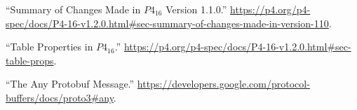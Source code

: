 \documentclass[11pt]{article}
\begin{document}
{{\begin{thebibliography}{38}
\mdbibitemlabel{{}[28]}\textquotedblleft{}Summary of Changes Made in $P4_{16}$ Version 1.1.0.\textquotedblright{} \href{https://p4.org/p4-spec/docs/P4-16-v1.2.0.html\%23sec-summary-of-changes-made-in-version-110}{{\ttfamily https://\hspace{0pt}p4.\hspace{0pt}org/\hspace{0pt}p4-\hspace{0pt}spec/\hspace{0pt}docs/\hspace{0pt}P4-\hspace{0pt}16-\hspace{0pt}v1.\hspace{0pt}2.\hspace{0pt}0.\hspace{0pt}html\#\hspace{0pt}sec-\hspace{0pt}summary-\hspace{0pt}of-\hspace{0pt}changes-\hspace{0pt}made-\hspace{0pt}in-\hspace{0pt}version-\hspace{0pt}110}}.\label{p4revisions110}%

\mdbibitemlabel{{}[29]}\textquotedblleft{}Table Properties in $P4_{16}$.\textquotedblright{} \href{https://p4.org/p4-spec/docs/P4-16-v1.2.0.html\%23sec-table-props}{{\ttfamily https://\hspace{0pt}p4.\hspace{0pt}org/\hspace{0pt}p4-\hspace{0pt}spec/\hspace{0pt}docs/\hspace{0pt}P4-\hspace{0pt}16-\hspace{0pt}v1.\hspace{0pt}2.\hspace{0pt}0.\hspace{0pt}html\#\hspace{0pt}sec-\hspace{0pt}table-\hspace{0pt}props}}.\label{p4tableproperties}%

\mdbibitemlabel{{}[30]}\textquotedblleft{}The Any Protobuf Message.\textquotedblright{} \href{https://developers.google.com/protocol-buffers/docs/proto3\%23any}{{\ttfamily https://\hspace{0pt}developers.\hspace{0pt}google.\hspace{0pt}com/\hspace{0pt}protocol-\hspace{0pt}buffers/\hspace{0pt}docs/\hspace{0pt}proto3\#\hspace{0pt}any}}.\label{protoany}%


\end{thebibliography}}}
\end{document}
